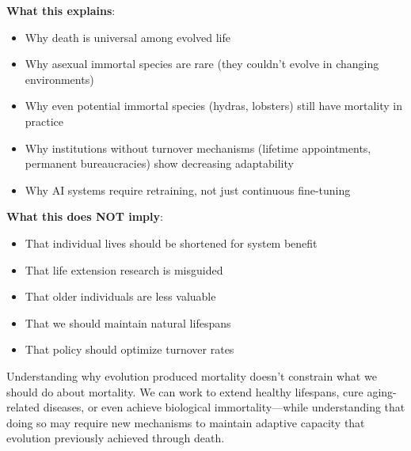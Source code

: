 \textbf{What this explains}:
\begin{itemize}
    \item Why death is universal among evolved life
    \item Why asexual immortal species are rare (they couldn't evolve in changing environments)
    \item Why even potential immortal species (hydras, lobsters) still have mortality in practice
    \item Why institutions without turnover mechanisms (lifetime appointments, permanent bureaucracies) show decreasing adaptability
    \item Why AI systems require retraining, not just continuous fine-tuning
\end{itemize}

\textbf{What this does NOT imply}:
\begin{itemize}
    \item That individual lives should be shortened for system benefit
    \item That life extension research is misguided
    \item That older individuals are less valuable
    \item That we should maintain natural lifespans
    \item That policy should optimize turnover rates
\end{itemize}

Understanding why evolution produced mortality doesn't constrain what we should do about mortality. We can work to extend healthy lifespans, cure aging-related diseases, or even achieve biological immortality—while understanding that doing so may require new mechanisms to maintain adaptive capacity that evolution previously achieved through death.